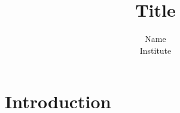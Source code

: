 \documentclass[11pt]{article}
\title{Title}
\author{
    Name\\
    Institute\\
    \email{email@email.com}
}
\date{}
\begin{document}
    \maketitle  

    \begin{abstract}

    \end{abstract}
    \newpage

    \section{Introduction}
    

    \newpage

 
\end{document}
